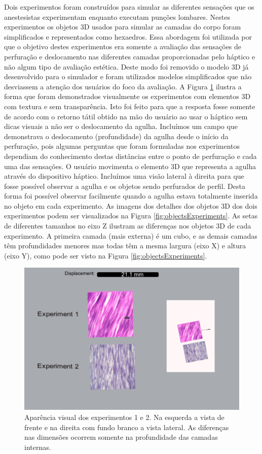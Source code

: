 Dois experimentos foram construídos para simular as diferentes sensações que os anestesistas experimentam enquanto executam punções lombares. Nestes experimentos os objetos 3D usados para simular as camadas do corpo foram simplificados e representados como hexaedros. Essa abordagem foi utilizada por que o objetivo destes experimentos era somente a avaliação das sensações de perfuração e deslocamento nas diferentes camadas proporcionadas pelo háptico e não algum tipo de avaliação estética. Deste modo foi removido o modelo 3D já desenvolvido para o simulador e foram utilizados modelos simplificados que não desviassem a atenção dos usuários do foco da avaliação. 
A Figura \ref{fig:visualExperimentos1e2} ilustra a forma que foram demonstrados visualmente os experimentos com elementos 3D com textura e sem transparência. Isto foi feito para que a resposta fosse somente de acordo com o retorno tátil obtido na mão do usuário ao usar o háptico sem dicas visuais a não ser o deslocamento da agulha. Incluímos um campo que demonstrava o deslocamento (profundidade) da agulha desde o início da perfuração, pois algumas perguntas que foram formuladas nos experimentos dependiam do conhecimento destas distâncias entre o ponto de perfuração e cada uma das sensações. O usuário movimenta o elemento 3D que representa a agulha através do dispositivo háptico. Incluímos uma visão lateral à direita para que fosse possível observar a agulha e os objetos sendo perfurados de perfil. Desta forma foi possível observar facilmente quando a agulha estava totalmente inserida no objeto em cada experimento.
As imagens dos detalhes dos objetos 3D dos dois experimentos podem ser visualizados na Figura \ref{fig:objectsExperiments}. As setas de diferentes tamanhos no eixo Z ilustram as diferenças nos objetos 3D de cada experimento. A primeira camada (mais externa) é um cubo, e as demais camadas têm profundidades menores mas todas têm a mesma largura (eixo X) e altura (eixo Y), como pode ser visto na Figura \ref{fig:objectsExperiments}.

\begin{figure}[ht!]
    \centering
    \includegraphics[width=0.8\linewidth]{capitulos/figuras/visual-experimentos.png} 
    \caption{Aparência visual dos experimentos 1 e 2. Na esquerda a vista de frente e na direita com fundo branco a vista lateral. As diferenças nas dimensões ocorrem somente na profundidade das camadas internas.}
    \label{fig:visualExperimentos1e2}
\end{figure}

